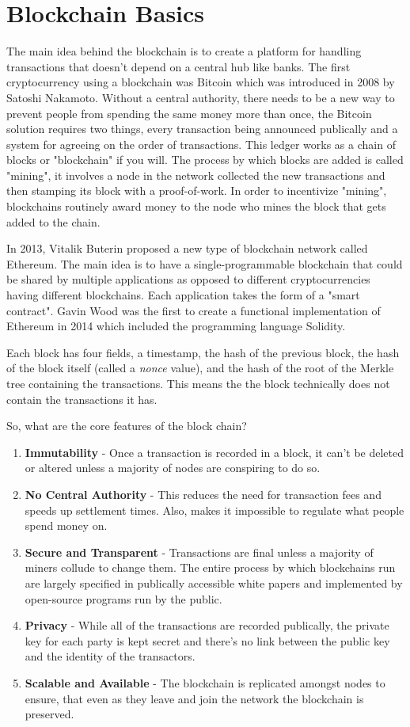 \documentclass{article}
\begin{document}
\section{Blockchain Basics}

The main idea behind the blockchain is to create a platform for handling transactions that doesn't depend on a central hub like banks. The first cryptocurrency using a blockchain was Bitcoin which was introduced in 2008 by Satoshi Nakamoto. Without a central authority, there needs to be a new way to prevent people from spending the same money more than once, the Bitcoin solution requires two things, every transaction being announced publically and a system for agreeing on the order of transactions. This ledger works as a chain of blocks or "blockchain" if you will. The process by which blocks are added is called "mining", it involves a node in the network collected the new transactions and then stamping its block with a proof-of-work. In order to incentivize "mining", blockchains routinely award money to the node who mines the block that gets added to the chain.

In 2013, Vitalik Buterin proposed a new type of blockchain network called Ethereum. The main idea is to have a single-programmable blockchain that could be shared by multiple applications as opposed to different cryptocurrencies having different blockchains. Each application takes the form of a "smart contract". Gavin Wood was the first to create a functional implementation of Ethereum in 2014 which included the programming language Solidity.

Each block has four fields, a timestamp, the hash of the previous block, the hash of the block itself (called a \textit{nonce} value), and the hash of the root of the Merkle tree containing the transactions. This means the the block technically does not contain the transactions it has.

So, what are the core features of the block chain?
\begin{enumerate}
\item \textbf{Immutability} - Once a transaction is recorded in a block, it can't be deleted or altered unless a majority of nodes are conspiring to do so.
\item \textbf{No Central Authority} - This reduces the need for transaction fees and speeds up settlement times. Also, makes it impossible to regulate what people spend money on.
\item \textbf{Secure and Transparent} - Transactions are final unless a majority of miners collude to change them. The entire process by which blockchains run are largely specified in publically accessible white papers and implemented by open-source programs run by the public.
\item \textbf{Privacy} - While all of the transactions are recorded publically, the private key for each party is kept secret and there's no link between the public key and the identity of the transactors.
\item \textbf{Scalable and Available} - The blockchain is replicated amongst nodes to ensure, that even as they leave and join the network the blockchain is preserved.
\end{enumerate}
\end{document}
